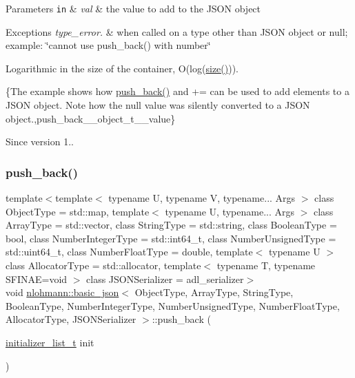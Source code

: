 \begin{DoxyParams}[1]{Parameters}
\mbox{\tt in}  & {\em val} & the value to add to the J\+S\+ON object\\
\hline
\end{DoxyParams}

\begin{DoxyExceptions}{Exceptions}
{\em type\+\_\+error.} & when called on a type other than J\+S\+ON object or null; example\+: {\ttfamily \char`\"{}cannot use push\+\_\+back() with number\char`\"{}}\\
\hline
\end{DoxyExceptions}
Logarithmic in the size of the container, O(log({\ttfamily \mbox{\hyperlink{classnlohmann_1_1basic__json_a25e27ad0c6d53c01871c5485e1f75b96}{size()}}})).

\{The example shows how {\ttfamily \mbox{\hyperlink{classnlohmann_1_1basic__json_ac8e523ddc8c2dd7e5d2daf0d49a9c0d7}{push\+\_\+back()}}} and {\ttfamily +=} can be used to add elements to a J\+S\+ON object. Note how the {\ttfamily null} value was silently converted to a J\+S\+ON object.,push\+\_\+back\+\_\+\+\_\+object\+\_\+t\+\_\+\+\_\+value\}

\begin{DoxySince}{Since}
version 1.. 
\end{DoxySince}
\mbox{\label{classnlohmann_1_1basic__json_a1be31ef2d2934d37a818083a4af44f99}} 
\subsubsection{\texorpdfstring{push\+\_\+back()}{push\_back()}\hspace{0.1cm}{\footnotesize\ttfamily [4/4]}}
{\footnotesize\ttfamily template$<$template$<$ typename U, typename V, typename... Args $>$ class Object\+Type = std\+::map, template$<$ typename U, typename... Args $>$ class Array\+Type = std\+::vector, class String\+Type  = std\+::string, class Boolean\+Type  = bool, class Number\+Integer\+Type  = std\+::int64\+\_\+t, class Number\+Unsigned\+Type  = std\+::uint64\+\_\+t, class Number\+Float\+Type  = double, template$<$ typename U $>$ class Allocator\+Type = std\+::allocator, template$<$ typename T, typename S\+F\+I\+N\+A\+E=void $>$ class J\+S\+O\+N\+Serializer = adl\+\_\+serializer$>$ \\
void \mbox{\hyperlink{classnlohmann_1_1basic__json}{nlohmann\+::basic\+\_\+json}}$<$ Object\+Type, Array\+Type, String\+Type, Boolean\+Type, Number\+Integer\+Type, Number\+Unsigned\+Type, Number\+Float\+Type, Allocator\+Type, J\+S\+O\+N\+Serializer $>$\+::push\+\_\+back (\begin{DoxyParamCaption}\item[{\mbox{\hyperlink{classnlohmann_1_1basic__json_ad70a098fbc01c53497db29d3b5b656a9}{initializer\+\_\+list\+\_\+t}}}]{init }\end{DoxyParamCaption})\hspace{0.3cm}{\ttfamily [inline]}}



